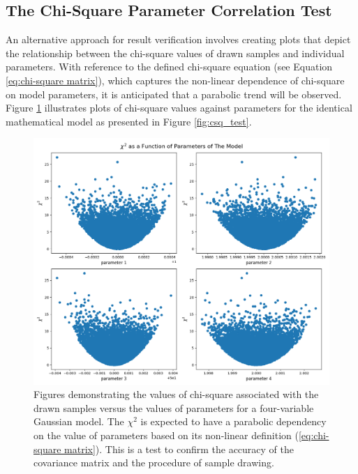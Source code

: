 \documentclass[12pt, TexShade, letterpaper]{report}
\begin{document}
\subsection{The Chi-Square Parameter Correlation Test}
\label{chap:method,sub:test,subsub:plot}
An alternative approach for result verification involves creating plots that depict the relationship between the chi-square values of drawn samples and individual parameters. With reference to the defined chi-square equation (see Equation \ref{eq:chi-square matrix}), which captures the non-linear dependence of chi-square on model parameters, it is anticipated that a parabolic trend will be observed. Figure \ref{fig:csq_params} illustrates plots of chi-square values against parameters for the identical mathematical model as presented in Figure \ref{fig:csq_test}. \par

\begin{figure}[h!]
\centering
\includegraphics[scale =0.5]{csq_vs_params.png}
\caption[Chi-Square vs. parameters plots]{Figures demonstrating the values of chi-square associated with the drawn samples versus the values of parameters for a four-variable Gaussian model. The $\chi^2$ is expected to have a parabolic dependency on the value of parameters based on its non-linear definition (\ref{eq:chi-square matrix}). This is a test to confirm the accuracy of the covariance matrix and the procedure of sample drawing.}
\label{fig:csq_params}
\end{figure}
\end{document}
